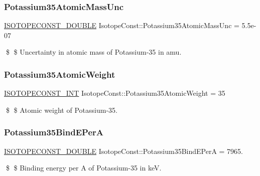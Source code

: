 \subsubsection{\texorpdfstring{Potassium35\+Atomic\+Mass\+Unc}{Potassium35AtomicMassUnc}}
{\footnotesize\ttfamily \mbox{\hyperlink{group___isotope_const-_macros_ga8f45a7272ce02c0b4c65c44636ed719a}{I\+S\+O\+T\+O\+P\+E\+C\+O\+N\+S\+T\+\_\+\+D\+O\+U\+B\+LE}} Isotope\+Const\+::\+Potassium35\+Atomic\+Mass\+Unc = 5.\+5e-\/07}

\$ \$ Uncertainty in atomic mass of Potassium-\/35 in amu. \mbox{\label{group___isotope_const-_potassium-_k35_gaf7d56a6836fc53bd817ef05ad8866f46}} 
\subsubsection{\texorpdfstring{Potassium35\+Atomic\+Weight}{Potassium35AtomicWeight}}
{\footnotesize\ttfamily \mbox{\hyperlink{group___isotope_const-_macros_ga5f18360b3e99483a35c32d789e62621c}{I\+S\+O\+T\+O\+P\+E\+C\+O\+N\+S\+T\+\_\+\+I\+NT}} Isotope\+Const\+::\+Potassium35\+Atomic\+Weight = 35}

\$ \$ Atomic weight of Potassium-\/35. \mbox{\label{group___isotope_const-_potassium-_k35_ga0ec663da1d102bfd89ea5137a0c743dc}} 
\subsubsection{\texorpdfstring{Potassium35\+Bind\+E\+PerA}{Potassium35BindEPerA}}
{\footnotesize\ttfamily \mbox{\hyperlink{group___isotope_const-_macros_ga8f45a7272ce02c0b4c65c44636ed719a}{I\+S\+O\+T\+O\+P\+E\+C\+O\+N\+S\+T\+\_\+\+D\+O\+U\+B\+LE}} Isotope\+Const\+::\+Potassium35\+Bind\+E\+PerA = 7965.}

\$ \$ Binding energy per A of Potassium-\/35 in keV. \mbox{\label{group___isotope_const-_potassium-_k35_gaa52fad3362c0673c6cde13d13ef99c9e}} 
